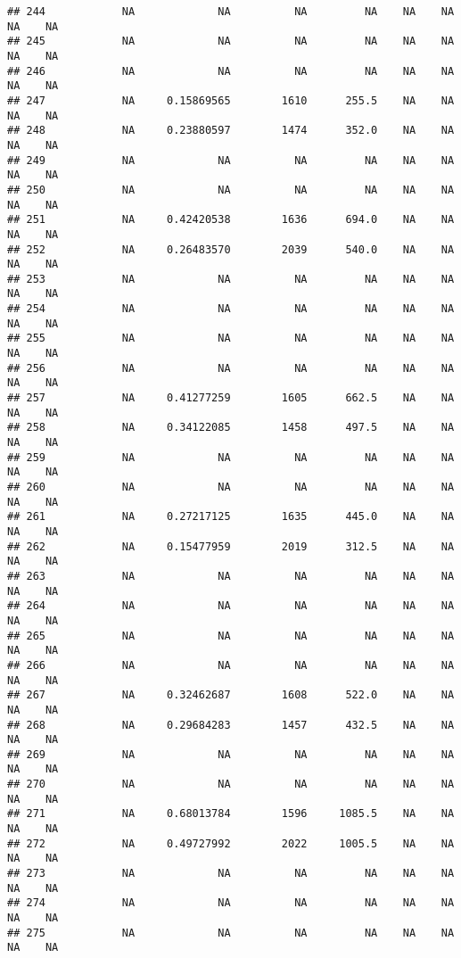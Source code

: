 \documentclass[]{article}
\begin{document}
\begin{verbatim}
## 244            NA             NA          NA         NA    NA    NA    NA    NA
## 245            NA             NA          NA         NA    NA    NA    NA    NA
## 246            NA             NA          NA         NA    NA    NA    NA    NA
## 247            NA     0.15869565        1610      255.5    NA    NA    NA    NA
## 248            NA     0.23880597        1474      352.0    NA    NA    NA    NA
## 249            NA             NA          NA         NA    NA    NA    NA    NA
## 250            NA             NA          NA         NA    NA    NA    NA    NA
## 251            NA     0.42420538        1636      694.0    NA    NA    NA    NA
## 252            NA     0.26483570        2039      540.0    NA    NA    NA    NA
## 253            NA             NA          NA         NA    NA    NA    NA    NA
## 254            NA             NA          NA         NA    NA    NA    NA    NA
## 255            NA             NA          NA         NA    NA    NA    NA    NA
## 256            NA             NA          NA         NA    NA    NA    NA    NA
## 257            NA     0.41277259        1605      662.5    NA    NA    NA    NA
## 258            NA     0.34122085        1458      497.5    NA    NA    NA    NA
## 259            NA             NA          NA         NA    NA    NA    NA    NA
## 260            NA             NA          NA         NA    NA    NA    NA    NA
## 261            NA     0.27217125        1635      445.0    NA    NA    NA    NA
## 262            NA     0.15477959        2019      312.5    NA    NA    NA    NA
## 263            NA             NA          NA         NA    NA    NA    NA    NA
## 264            NA             NA          NA         NA    NA    NA    NA    NA
## 265            NA             NA          NA         NA    NA    NA    NA    NA
## 266            NA             NA          NA         NA    NA    NA    NA    NA
## 267            NA     0.32462687        1608      522.0    NA    NA    NA    NA
## 268            NA     0.29684283        1457      432.5    NA    NA    NA    NA
## 269            NA             NA          NA         NA    NA    NA    NA    NA
## 270            NA             NA          NA         NA    NA    NA    NA    NA
## 271            NA     0.68013784        1596     1085.5    NA    NA    NA    NA
## 272            NA     0.49727992        2022     1005.5    NA    NA    NA    NA
## 273            NA             NA          NA         NA    NA    NA    NA    NA
## 274            NA             NA          NA         NA    NA    NA    NA    NA
## 275            NA             NA          NA         NA    NA    NA    NA    NA

\end{verbatim}
\end{document}
